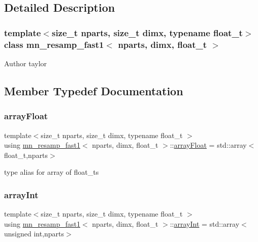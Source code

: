 \subsection{Detailed Description}
\subsubsection*{template$<$size\+\_\+t nparts, size\+\_\+t dimx, typename float\+\_\+t$>$\newline
class mn\+\_\+resamp\+\_\+fast1$<$ nparts, dimx, float\+\_\+t $>$}

\begin{DoxyAuthor}{Author}
taylor 
\end{DoxyAuthor}


\subsection{Member Typedef Documentation}
\mbox{\label{classmn__resamp__fast1_a9c95e7078cc9709024031bac44b431d6}} 
\subsubsection{\texorpdfstring{array\+Float}{arrayFloat}}
{\footnotesize\ttfamily template$<$size\+\_\+t nparts, size\+\_\+t dimx, typename float\+\_\+t $>$ \\
using \hyperlink{classmn__resamp__fast1}{mn\+\_\+resamp\+\_\+fast1}$<$ nparts, dimx, float\+\_\+t $>$\+::\hyperlink{classrbase_a6f76bef853e508cb5b6f546d231b06f5}{array\+Float} =  std\+::array$<$float\+\_\+t,nparts$>$}

type alias for array of float\+\_\+ts \mbox{\label{classmn__resamp__fast1_a8bf919fd596ab39fccbe152f5a742022}} 
\subsubsection{\texorpdfstring{array\+Int}{arrayInt}}
{\footnotesize\ttfamily template$<$size\+\_\+t nparts, size\+\_\+t dimx, typename float\+\_\+t $>$ \\
using \hyperlink{classmn__resamp__fast1}{mn\+\_\+resamp\+\_\+fast1}$<$ nparts, dimx, float\+\_\+t $>$\+::\hyperlink{classmn__resamp__fast1_a8bf919fd596ab39fccbe152f5a742022}{array\+Int} =  std\+::array$<$unsigned int,nparts$>$}

